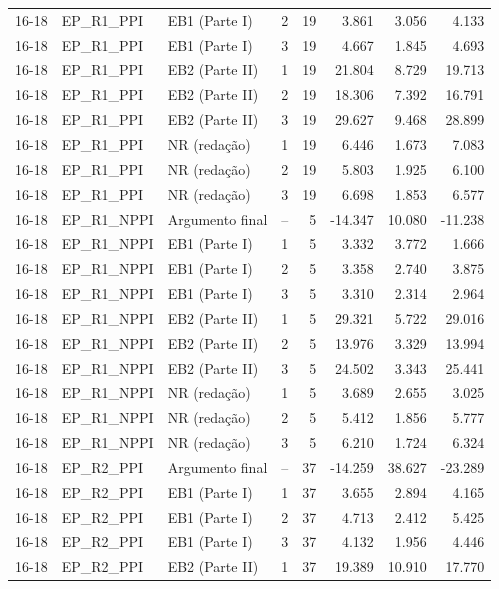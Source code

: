\begin{longtable}{lllcrrrr}
16-18 & EP\_R1\_PPI & EB1 (Parte I) & 2 & 19 & 3.861 & 3.056 & 4.133 \\
16-18 & EP\_R1\_PPI & EB1 (Parte I) & 3 & 19 & 4.667 & 1.845 & 4.693 \\
16-18 & EP\_R1\_PPI & EB2 (Parte II) & 1 & 19 & 21.804 & 8.729 & 19.713 \\
16-18 & EP\_R1\_PPI & EB2 (Parte II) & 2 & 19 & 18.306 & 7.392 & 16.791 \\
16-18 & EP\_R1\_PPI & EB2 (Parte II) & 3 & 19 & 29.627 & 9.468 & 28.899 \\
16-18 & EP\_R1\_PPI & NR (redação) & 1 & 19 & 6.446 & 1.673 & 7.083 \\
16-18 & EP\_R1\_PPI & NR (redação) & 2 & 19 & 5.803 & 1.925 & 6.100 \\
16-18 & EP\_R1\_PPI & NR (redação) & 3 & 19 & 6.698 & 1.853 & 6.577 \\
16-18 & EP\_R1\_NPPI & Argumento final & -- & 5 & -14.347 & 10.080 & -11.238 \\
16-18 & EP\_R1\_NPPI & EB1 (Parte I) & 1 & 5 & 3.332 & 3.772 & 1.666 \\
16-18 & EP\_R1\_NPPI & EB1 (Parte I) & 2 & 5 & 3.358 & 2.740 & 3.875 \\
16-18 & EP\_R1\_NPPI & EB1 (Parte I) & 3 & 5 & 3.310 & 2.314 & 2.964 \\
16-18 & EP\_R1\_NPPI & EB2 (Parte II) & 1 & 5 & 29.321 & 5.722 & 29.016 \\
16-18 & EP\_R1\_NPPI & EB2 (Parte II) & 2 & 5 & 13.976 & 3.329 & 13.994 \\
16-18 & EP\_R1\_NPPI & EB2 (Parte II) & 3 & 5 & 24.502 & 3.343 & 25.441 \\
16-18 & EP\_R1\_NPPI & NR (redação) & 1 & 5 & 3.689 & 2.655 & 3.025 \\
16-18 & EP\_R1\_NPPI & NR (redação) & 2 & 5 & 5.412 & 1.856 & 5.777 \\
16-18 & EP\_R1\_NPPI & NR (redação) & 3 & 5 & 6.210 & 1.724 & 6.324 \\
16-18 & EP\_R2\_PPI & Argumento final & -- & 37 & -14.259 & 38.627 & -23.289 \\
16-18 & EP\_R2\_PPI & EB1 (Parte I) & 1 & 37 & 3.655 & 2.894 & 4.165 \\
16-18 & EP\_R2\_PPI & EB1 (Parte I) & 2 & 37 & 4.713 & 2.412 & 5.425 \\
16-18 & EP\_R2\_PPI & EB1 (Parte I) & 3 & 37 & 4.132 & 1.956 & 4.446 \\
16-18 & EP\_R2\_PPI & EB2 (Parte II) & 1 & 37 & 19.389 & 10.910 & 17.770 \\

\end{longtable}
